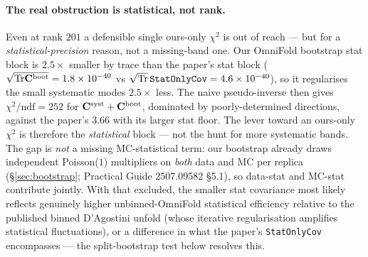 \paragraph{The real obstruction is statistical, not rank.}
Even at rank $201$ a defensible single ours-only $\chi^{2}$ is out of
reach --- but for a \emph{statistical-precision} reason, not a missing-band
one. Our OmniFold bootstrap stat block is $2.5\times$ smaller by trace than
the paper's stat block ($\sqrt{\mathrm{Tr}\mathbf{C}^{\text{boot}}}=1.8\times10^{-40}$ vs
$\sqrt{\mathrm{Tr}}\,\texttt{StatOnlyCov}=4.6\times10^{-40}$), so it regularises the
small systematic modes $2.5\times$ less. The naive pseudo-inverse then gives
$\chi^{2}/\mathrm{ndf}=252$ for $\mathbf{C}^{\text{syst}}+\mathbf{C}^{\text{boot}}$,
dominated by poorly-determined directions, against the paper's $3.66$ with
its larger stat floor. The lever toward an ours-only $\chi^{2}$ is therefore
the \emph{statistical} block --- not the hunt for more systematic bands.
The gap is \emph{not} a missing MC-statistical term: our bootstrap already
draws independent Poisson($1$) multipliers on \emph{both} data and MC per
replica (\S\ref{sec:bootstrap}; Practical Guide 2507.09582 \S5.1), so
data-stat and MC-stat contribute jointly. With that excluded, the smaller
stat covariance most likely reflects genuinely higher unbinned-OmniFold
statistical efficiency relative to the published binned D'Agostini unfold
(whose iterative regularisation amplifies statistical fluctuations), or a
difference in what the paper's \texttt{StatOnlyCov} encompasses ---
the split-bootstrap test below resolves this.

